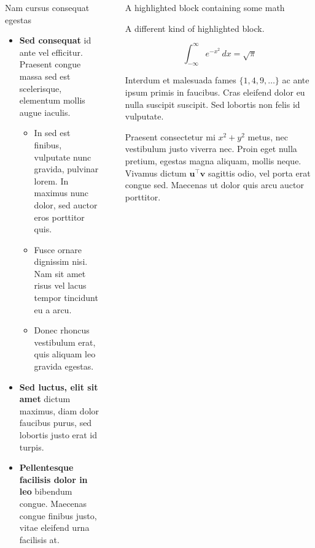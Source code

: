 \documentclass[final]{beamer}
\newlength{\sepwidth}
\newlength{\colwidth}
\newcommand{\separatorcolumn}{\begin{column}{\sepwidth}\end{column}}
\begin{document}
\begin{frame}[t]
\begin{columns}[t]
\begin{column}{\colwidth}
\begin{block}{Nam cursus consequat egestas}
    \begin{itemize}
      \item \textbf{Sed consequat} id ante vel efficitur. Praesent congue massa
        sed est scelerisque, elementum mollis augue iaculis.
        \begin{itemize}
          \item In sed est finibus, vulputate
            nunc gravida, pulvinar lorem. In maximus nunc dolor, sed auctor eros
            porttitor quis.
          \item Fusce ornare dignissim nisi. Nam sit amet risus vel lacus
            tempor tincidunt eu a arcu.
          \item Donec rhoncus vestibulum erat, quis aliquam leo
            gravida egestas.
        \end{itemize}
      \item \textbf{Sed luctus, elit sit amet} dictum maximus, diam dolor
        faucibus purus, sed lobortis justo erat id turpis.
      \item \textbf{Pellentesque facilisis dolor in leo} bibendum congue.
        Maecenas congue finibus justo, vitae eleifend urna facilisis at.
    \end{itemize}

  \end{block}

\end{column}

\separatorcolumn

\begin{column}{\colwidth}

  \begin{exampleblock}{A highlighted block containing some math}

    A different kind of highlighted block.

    $$
    \int_{-\infty}^{\infty} e^{-x^2}\,dx = \sqrt{\pi}
    $$

    Interdum et malesuada fames $\{1, 4, 9, \ldots\}$ ac ante ipsum primis in
    faucibus. Cras eleifend dolor eu nulla suscipit suscipit. Sed lobortis non
    felis id vulputate.


    Praesent consectetur mi $x^2 + y^2$ metus, nec vestibulum justo viverra
    nec. Proin eget nulla pretium, egestas magna aliquam, mollis neque. Vivamus
    dictum $\mathbf{u}^\intercal\mathbf{v}$ sagittis odio, vel porta erat
    congue sed. Maecenas ut dolor quis arcu auctor porttitor.


\end{exampleblock}
\end{column}
\end{columns}
\end{frame}
\end{document}
